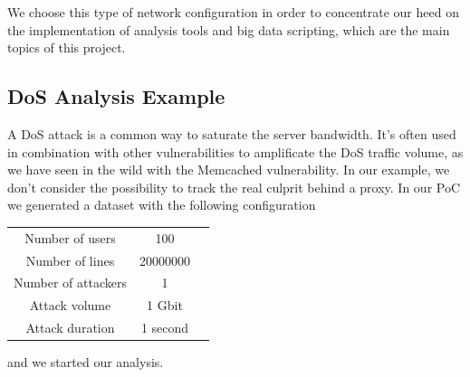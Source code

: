 We choose this type of network configuration in order to concentrate our heed on the implementation of analysis tools and big data scripting, which are the main topics of this project.
 


\subsection{DoS Analysis Example}
A DoS attack is a common way to saturate the server bandwidth. It's often used in combination with other vulnerabilities to amplificate the DoS traffic volume, as we have seen in the wild with the Memcached vulnerability\cite{memcached_vulnerability}. In our example, we don't consider the possibility to track the real culprit behind a proxy.
In our PoC we generated a dataset with the following configuration
\begin{center}
\begin{tabular}{ |c|c|c| } 
 \hline
 Number of users & 100 \\ 
 Number of lines & 20000000 \\ 
 Number of attackers & 1 \\ 
 Attack volume & 1 Gbit \\
 Attack duration & 1 second \\  
 \hline
\end{tabular}
\end{center}
and we started our analysis. \\

